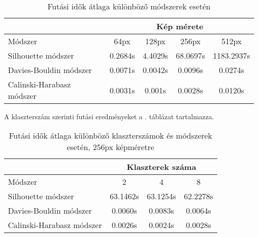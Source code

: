 \begin{table}[h]
\centering
\caption{Futási idők átlaga különböző módszerek esetén}
\label{tab:size_runtimes}
\medskip
\begin{tabular}{|l|c|c|c|c|}
\cline{2-5}
 \multicolumn{1}{c|}{} & \multicolumn{4}{c|}{Kép mérete} \\
 \hline
 Módszer & 64px & 128px & 256px & 512px \\
\hline
Silhouette módszer & 0.2684s & 4.4029s & 68.0697s & 1183.2937s \\
Davies-Bouldin módszer & 0.0071s & 0.0042s & 0.0096s & 0.0274s \\
Calinski-Harabasz módszer & 0.0031s & 0.001s & 0.0028s & 0.0120s \\
\hline
\end{tabular}
\end{table}

A klaszterszám szerinti futási eredményeket a . táblázat tartalmazza.

\begin{table}[h]
\centering
\caption{Futási idők átlaga különböző klaszterszámok és módszerek esetén, 256px képméretre}
\label{tab:cluster_runtimes}
\medskip
\begin{tabular}{|l|c|c|c|}
\cline{2-4}
 \multicolumn{1}{c|}{} & \multicolumn{3}{c|}{Klaszterek száma} \\
 \hline
 Módszer & 2 & 4 & 8 \\
\hline
Silhouette módszer & 63.1462s & 63.1254s & 62.2278s \\
Davies-Bouldin módszer & 0.0060s & 0.0083s & 0.0064s \\
Calinski-Harabasz módszer & 0.0026s & 0.0024s & 0.0028s \\
\hline
\end{tabular}
\end{table}
